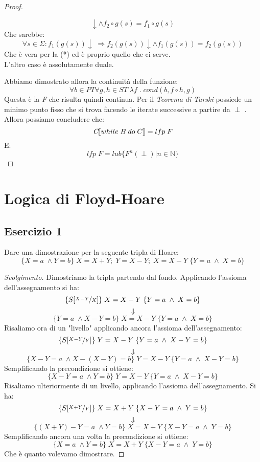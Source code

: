 \documentclass[a4paper, 10pt]{article} %
\begin{document}
\begin{proof}
\begin{itemize}
$$    \downarrow \land f_2 \circ g(s) = f_1 \circ g(s) $$
    Che sarebbe:
    $$ \forall s \in \Sigma : f_{1}(g(s)) \downarrow \; \Rightarrow f_{2}(g(s)) 
    \downarrow \land f_{1}(g(s)) = f_{2}(g(s)) $$
    Che è vera per la (*) ed è proprio quello che ci serve. \\
    L'altro caso è assolutamente duale.
  \end{itemize}
  Abbiamo dimostrato allora la continuità della funzione:
  $$ \forall b \in PT \forall g,h \in ST \; \lambda f \; . \; cond(b,f \circ h,g) $$
  Questa è la \emph{F} che risulta quindi continua. Per il \emph{Teorema di Tarski} possiede un minimo punto fisso che si trova facendo le iterate successive a partire da $\perp$ . Allora possiamo concludere che:
  $$ \emph{C} \llbracket while \; B \; do \; C \rrbracket = lfp \; F $$
  E:
  $$ lfp \; F = lub \{ F^n(\perp ) | n \in \mathbb{N} \} $$
\end{proof}
\newpage

\section{Logica di Floyd-Hoare}
\newcommand{\mactext}[1]{\text{\texttt{#1}}}

\subsection{Esercizio 1}
Dare una dimostrazione per la seguente tripla di Hoare:
$$ \{X=a \; \land Y=b\} \; X=X+Y; \; Y=X-Y; \; X=X-Y \; \{Y=a \; \land \; X=b\} $$

\begin{proof}[Svolgimento]
Dimostriamo la tripla partendo dal fondo. Applicando l'assioma dell'assegnamento si ha:
$$ \{S[\nicefrac{X-Y}{X}] \} \; X=X-Y \; \{Y=a \; \land \; X=b\} $$
$$ \Downarrow $$
$$ \{Y=a \; \land X-Y=b \} \; X=X-Y \; \{Y=a \; \land \; X=b\} $$
Risaliamo ora di un "livello" applicando ancora l'assioma dell'assegnamento:
$$ \{S[\nicefrac{X-Y}{Y}] \} \; Y=X-Y \; \{Y=a \; \land \; X-Y=b\} $$
$$ \Downarrow $$
$$ \{X-Y=a \; \land X-(X-Y)=b \} \; Y=X-Y \; \{Y=a \; \land \; X-Y=b\} $$
Semplificando la precondizione si ottiene:
$$ \{X-Y=a \; \land Y=b \} \; Y=X-Y \; \{Y=a \; \land \; X-Y=b\} $$
Risaliamo ulteriormente di un livello, applicando l'assioma dell'assegnamento. Si ha:
$$ \{S[\nicefrac{X+Y}{Y}] \} \; X=X+Y \; \{X-Y=a \; \land \; Y=b\} $$
$$ \Downarrow $$
$$ \{(X+Y)-Y=a \; \land Y=b \} \; X=X+Y \; \{X-Y=a \; \land \; Y=b\} $$
Semplificando ancora una volta la precondizione si ottiene:
$$ \{X=a \; \land Y=b \} \; X=X+Y \; \{X-Y=a \; \land \; Y=b\} $$
Che è quanto volevamo dimostrare.
\end{proof}
\end{document}
